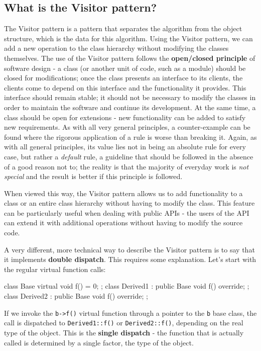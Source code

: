 \subsection{What is the Visitor pattern?}

The Visitor pattern is a pattern that separates the algorithm from the object structure, which is the data for this algorithm. Using the Visitor pattern, we can add a new operation to the class hierarchy without modifying the classes themselves. The use of the Visitor pattern follows the \textbf{open/closed principle} of software design - a class (or another unit of code, such as a module) should be closed for modifications; once the class presents an interface to its clients, the clients come to depend on this interface and the functionality it provides. This interface should remain stable; it should not be necessary to modify the classes in order to maintain the software and continue its development. At the same time, a class should be open for extensions - new functionality can be added to satisfy new requirements. As with all very general principles, a counter-example can be found where the rigorous application of a rule is worse than breaking it. Again, as with all general principles, its value lies not in being an absolute rule for every case, but rather a \emph{default} rule, a guideline that should be followed in the absence of a good reason not to; the reality is that the majority of everyday work is \emph{not special} and the result is better if this principle is followed.

When viewed this way, the Visitor pattern allows us to add functionality to a class or an entire class hierarchy without having to modify the class. This feature can be particularly useful when dealing with public APIs - the users of the API can extend it with additional operations without having to modify the source code.

A very different, more technical way to describe the Visitor pattern is to say that it implements \textbf{double dispatch}. This requires some explanation. Let's start with the regular virtual function calls:

\begin{code}
class Base {
  virtual void f() = 0;
};
class Derived1 : public Base {
  void f() override;
};
class Derived2 : public Base {
  void f() override;
};
\end{code}

If we invoke the \texttt{b-\textgreater{}f()} virtual function through a pointer to the \texttt{b} base class, the call is dispatched to \texttt{Derived1::f()} or \texttt{Derived2::f()}, depending on the real type of the object. This is the \textbf{single dispatch} - the function that is actually called is determined by a single factor, the type of the object.

